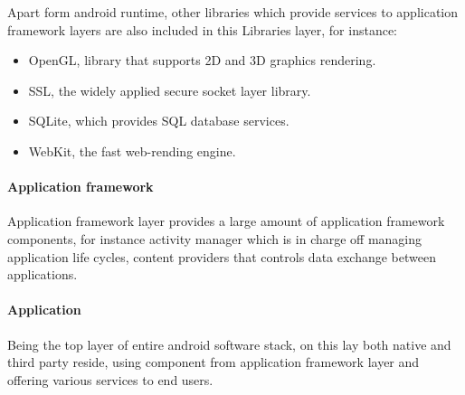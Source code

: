 \documentclass[]{llncs}
\begin{document}
Apart form  android runtime, other libraries which provide services to application framework layers are also included in this Libraries layer, for instance:
\begin{itemize}
\item OpenGL, library that supports 2D and 3D graphics rendering.
\item SSL, the widely applied secure socket layer library.
\item  SQLite, which provides SQL database services.
\item  WebKit, the fast  web-rending engine.
\end{itemize}
\paragraph{Application  framework} Application framework layer provides a large amount of application framework components, for instance activity manager which is in charge off managing application life cycles, content providers that controls data exchange between applications.
\paragraph{Application}Being the top layer of entire android software stack, on this lay both native and third party reside, using component from  application framework layer and   offering various services to end users.
\end{document}
